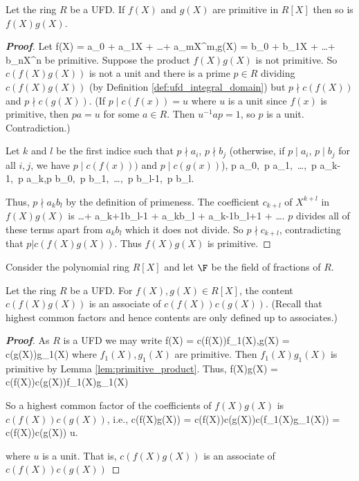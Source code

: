 \begin{lemma}\label{lem:primitive_product}
Let the ring $R$ be a UFD. If $f(X)$ and $g(X)$ are primitive in $R[X]$ then so is $f(X)g(X)$.
\end{lemma}

\begin{proof}[\bf Proof]
Let
\be
f(X) = a_0 + a_1X + \dots + a_mX^m,\quad g(X) = b_0 + b_1X + \dots + b_nX^n
\ee
be primitive. Suppose the product $f(X)g(X)$ is not primitive. So $c(f(X)g(X))$ is not a unit and there is a prime $p \in R$ dividing $c(f(X)g(X))$ (by Definition \ref{def:ufd_integral_domain}) but $p \nmid c(f(X))$ and $p \nmid c(g(X))$. (If $p\mid c(f(x)) =u$ where $u$ is a unit since $f(x)$ is primitive, then $pa = u$ for some $a\in R$. Then $u^{-1}a p = 1$, so $p$ is a unit. Contradiction.) %

Let $k$ and $l$ be the first indice such that $p\nmid a_i$, $p\nmid b_j$ (otherwise, if $p\mid a_i$, $p \mid b_j$ for all $i,j$, we have $p\mid c(f(x)))$ and $p\mid c(g(x))$),
\be
p \mid a_0,\ p \mid a_1,\ \dots ,\ p \mid a_{k-1},\ p \nmid a_k,\quad p \mid b_0,\ p \mid b_1,\ \dots ,\ p \mid b_{l-1},\ p \nmid b_l.
\ee

Thus, $p\nmid a_k b_l$ by the definition of primeness. The coefficient $c_{k+l}$ of $X^{k+l}$ in $f(X)g(X)$ is
\be
\dots + a_{k+1}b_{l-1} + a_kb_l + a_{k-1}b_{l+1} + \dots .
\ee
$p$ divides all of these terms apart from $a_kb_l$ which it does not divide. So $p \nmid c_{k+l}$, contradicting that $p | c(f(X)g(X))$. Thus $f(X)g(X)$ is primitive.
\end{proof}


Consider the polynomial ring $R[X]$ and let $\F$ be the field of fractions of $R$.

\begin{corollary}\label{cor:content_associate}
Let the ring $R$ be a UFD. For $f(X), g(X) \in R[X]$, the content $c(f(X)g(X))$ is an associate of $c(f(X))c(g(X))$. (Recall that highest common factors and hence contents are only
defined up to associates.)
\end{corollary}

\begin{proof}[\bf Proof]
As $R$ is a UFD we may write
\be
f(X) = c(f(X))f_1(X),\quad\quad g(X) = c(g(X))g_1(X)
\ee
where $f_1(X), g_1(X)$ are primitive. Then $f_1(X)g_1(X)$ is primitive by Lemma \ref{lem:primitive_product}. Thus,
\be
f(X)g(X) = c(f(X))c(g(X))f_1(X)g_1(X)
\ee

So a highest common factor of the coefficients of $f(X)g(X)$ is $c(f(X))c(g(X))$, i.e.,
\be
c(f(X)g(X)) = c(f(X))c(g(X))c(f_1(X)g_1(X)) = c(f(X))c(g(X)) u.
\ee

where $u$ is a unit. That is, $c(f(X)g(X))$ is an associate of $c(f(X))c(g(X))$
\end{proof}



